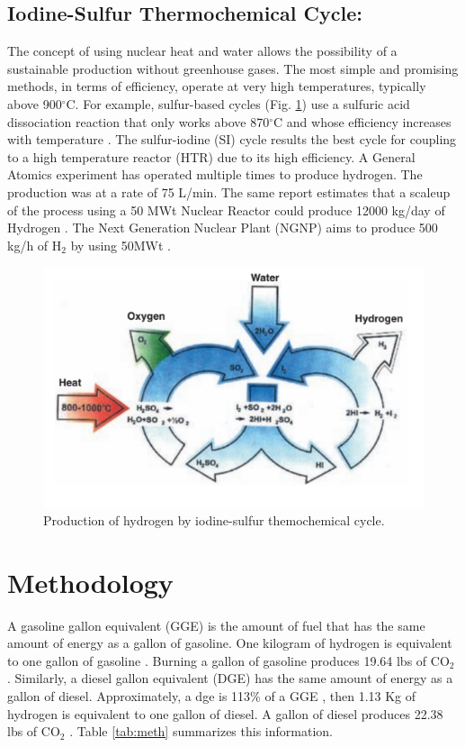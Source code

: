 \documentclass{anstrans}
\begin{document}
\subsection{Iodine-Sulfur Thermochemical Cycle:}

The concept of using nuclear heat and water allows the possibility of a sustainable production without greenhouse gases. The most simple and promising methods, in terms of efficiency, operate at very high temperatures, typically above 900$^{\circ}$C. For example, sulfur-based cycles (Fig. \ref{fig:isulfur}) use a sulfuric acid dissociation reaction that only works above 870$^{\circ}$C and whose efficiency increases with temperature \cite{cea_gas-cooled_2006}. The sulfur-iodine (SI) cycle results the best cycle for coupling to a high temperature reactor (HTR) due to its high efficiency. A General Atomics experiment has operated multiple times to produce hydrogen. The production was at a rate of 75 L/min. The same report estimates that a scaleup of the process using a 50 MWt Nuclear Reactor could produce 12000 kg/day of Hydrogen \cite{benjamin_russ_sulfur_2009}.
The Next Generation Nuclear Plant (NGNP) \cite{macdonald_ngnp_2003} aims to produce 500 kg/h of H$_2$ by using 50MWt \cite{cea_gas-cooled_2006}.

\begin{figure}[H]
	\centering
	\includegraphics[width=0.85\linewidth]{figures/iodine-sulfur.png}
	\hfill
	\caption{Production of hydrogen by iodine-sulfur themochemical cycle.}
	\label{fig:isulfur}
\end{figure}

\section{Methodology}
\label{method}

A gasoline gallon equivalent (GGE) is the amount of fuel that has the same amount of energy as a gallon of gasoline. One kilogram of hydrogen is equivalent to one gallon of gasoline \cite{noauthor_hydrogen_nodate}. Burning a gallon of gasoline produces 19.64 lbs of CO$_2$ \cite{noauthor_how_2014}. 
Similarly, a diesel gallon equivalent (DGE) has the same amount of energy as a gallon of diesel. Approximately, a dge is 113\% of a GGE \cite{noauthor_fuel_2014}, then 1.13 Kg of hydrogen is equivalent to one gallon of diesel.
A gallon of diesel produces 22.38 lbs of CO$_2$ \cite{noauthor_how_2014}. 
Table \ref{tab:meth} summarizes this information.
\end{document}

